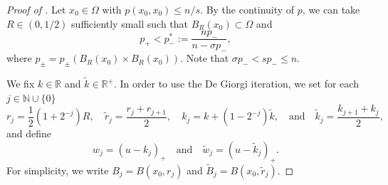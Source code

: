 \documentclass[11pt]{amsart}
\theoremstyle{plain}
\theoremstyle{definition}
\numberwithin{equation}{section}
\newcommand{\R}{\mathbb{R}}
\begin{document}
\begin{proof} [Proof of ]
Let $x_0 \in \Omega$ with $p(x_0,x_0) \leq n/s$. By the continuity of $p$, we can take $R \in (0,1/2)$ sufficiently small such that $B_{R}(x_0) \subset \Omega$ and
\begin{equation} \label{eq:p_close}
p_+ < p_-^{\ast} := \frac{np_-}{n-\sigma p_-},
\end{equation}
where $p_\pm = p_\pm(B_{R}(x_0) \times B_{R}(x_0))$. Note that $\sigma p_- < s p_- \leq n$.

We fix $k \in \R$ and $\tilde{k} \in \R^+$. In order to use the De Giorgi iteration, we set for each $j \in \mathbb{N} \cup \lbrace 0 \rbrace$
\begin{equation*}
r_j = \frac{1}{2}(1+2^{-j})R, \quad \tilde{r}_j = \frac{r_j+r_{j+1}}{2}, \quad k_j = k+(1-2^{-j}) \tilde{k}, \quad\text{and}\quad \tilde{k}_j = \frac{k_{j+1}+k_j}{2},
\end{equation*}
and define
\begin{equation*}
w_j = (u-k_j)_+ \quad\text{and}\quad \tilde{w}_j = (u-\tilde{k}_j)_+.
\end{equation*}
For simplicity, we write $B_j = B(x_0, r_j)$ and $\tilde{B}_j = B(x_0, \tilde{r}_j)$.


\end{proof}
\end{document}
